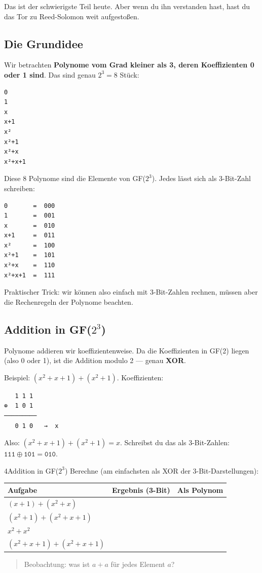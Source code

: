 Das ist der schwierigste Teil heute. Aber wenn du ihn verstanden
hast, hast du das Tor zu Reed-Solomon weit aufgestoßen.

\subsection*{Die Grundidee}

Wir betrachten \textbf{Polynome vom Grad kleiner als 3, deren
Koeffizienten 0 oder 1 sind}. Das sind genau $2^3 = 8$ Stück:

\begin{verbatim}
0
1
x
x+1
x²
x²+1
x²+x
x²+x+1
\end{verbatim}

Diese 8 Polynome sind die Elemente von GF($2^3$). Jedes lässt sich
als 3-Bit-Zahl schreiben:

\begin{verbatim}
0       =  000
1       =  001
x       =  010
x+1     =  011
x²      =  100
x²+1    =  101
x²+x    =  110
x²+x+1  =  111
\end{verbatim}

Praktischer Trick: wir können also einfach mit 3-Bit-Zahlen rechnen,
müssen aber die Rechenregeln der Polynome beachten.

\subsection*{Addition in GF($2^3$)}

Polynome addieren wir koeffizientenweise. Da die Koeffizienten in
GF(2) liegen (also 0 oder 1), ist die Addition modulo 2 — genau
\textbf{XOR}.

Beispiel: $(x^2+x+1) + (x^2+1)$. Koeffizienten:
\begin{verbatim}
   1 1 1
⊕  1 0 1
─────────
   0 1 0   →  x
\end{verbatim}

Also: $(x^2+x+1) + (x^2+1) = x$. Schreibst du das als 3-Bit-Zahlen:
$\texttt{111} \oplus \texttt{101} = \texttt{010}$.

\begin{bleistiftuebung}{4}{Addition in GF($2^3$)}
Berechne (am einfachsten als XOR der 3-Bit-Darstellungen):

\begin{center}
\begin{tabular}{lll}
  \toprule
  Aufgabe & Ergebnis (3-Bit) & Als Polynom \\
  \midrule
  $(x+1) + (x^2+x)$            & & \\
  $(x^2+1) + (x^2+x+1)$        & & \\
  $x^2 + x^2$                  & & \\
  $(x^2+x+1) + (x^2+x+1)$      & & \\
  \bottomrule
\end{tabular}
\end{center}

\begin{quote}
Beobachtung: was ist $a + a$ für jedes Element $a$?
\end{quote}
\end{bleistiftuebung}

